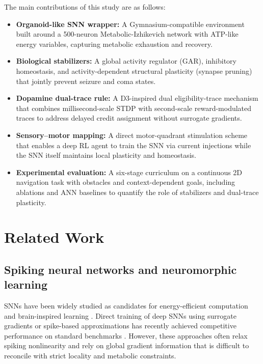 \documentclass[journal]{IEEEtran}
\begin{document}
The main contributions of this study are as follows:

\begin{itemize}
    \item \textbf{Organoid-like SNN wrapper:} A Gymnasium-compatible environment built around a 500-neuron Metabolic-Izhikevich network with ATP-like energy variables, capturing metabolic exhaustion and recovery.
    \item \textbf{Biological stabilizers:} A global activity regulator (GAR), inhibitory homeostasis, and activity-dependent structural plasticity (synapse pruning) that jointly prevent seizure and coma states.
    \item \textbf{Dopamine dual-trace rule:} A D3-inspired dual eligibility-trace mechanism that combines millisecond-scale STDP with second-scale reward-modulated traces to address delayed credit assignment without surrogate gradients.
    \item \textbf{Sensory--motor mapping:} A direct motor-quadrant stimulation scheme that enables a deep RL agent to train the SNN via current injections while the SNN itself maintains local plasticity and homeostasis.
    \item \textbf{Experimental evaluation:} A six-stage curriculum on a continuous 2D navigation task with obstacles and context-dependent goals, including ablations and ANN baselines to quantify the role of stabilizers and dual-trace plasticity.
\end{itemize}

\section{Related Work}

\subsection{Spiking neural networks and neuromorphic learning}

SNNs have been widely studied as candidates for energy-efficient computation and brain-inspired learning \cite{Izhikevich2003simple,NeuromorphicSNNMemristor2019,NeuromorphicReview2019,Davies2024Loihi}. 
Direct training of deep SNNs using surrogate gradients or spike-based approximations has recently achieved competitive performance on standard benchmarks \cite{RecentFrontiersSNN2022,DirectTrainingSNN2024}. 
However, these approaches often relax spiking nonlinearity and rely on global gradient information that is difficult to reconcile with strict locality and metabolic constraints.
\end{document}
